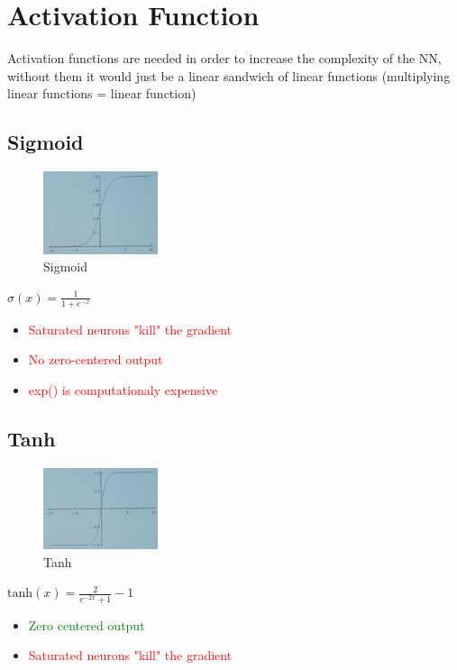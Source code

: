 \chapter{Activation Function}

Activation functions are needed in order to increase the complexity of the NN, without them it would just be a linear sandwich of linear functions (multiplying linear functions = linear function)


\section{Sigmoid}

\begin{figure}[!htb]
  \centering
  \includegraphics[width=0.3\textwidth]{Images/activation_f/1.png}
  \caption{Sigmoid }
\end{figure}
$\sigma (x) = \frac{1}{1+e^{-x}}$
\begin{itemize}
\item \textcolor{red}{Saturated neurons "kill" the gradient}
\item \textcolor{red}{No zero-centered output}
\item \textcolor{red}{exp() is computationaly expensive}
\end{itemize}


\section{Tanh}
\begin{figure}[!htb]
  \centering
  \includegraphics[width=0.3\textwidth]{Images/activation_f/2.png}
  \caption{Tanh }
\end{figure}
$\text{tanh} (x) = \frac{2}{e^{-2x}+1}-1$
\begin{itemize}
\item \textcolor{green}{Zero centered output}
\item \textcolor{red}{Saturated neurons "kill" the gradient}
\end{itemize}


